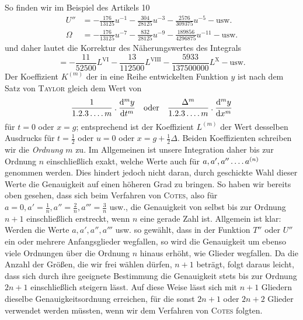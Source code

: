 So finden wir im Beispiel des Artikels 10
\[
\begin{aligned}
U''&=-\tfrac{176}{13125}u^{-1}-\tfrac{304}{28125}u^{-3}-\tfrac{2576}{309375}u^{-5}-\text{usw.}\\
\Omega&=-\tfrac{176}{13125}u^{-7}-\tfrac{832}{28125}u^{-9}-\tfrac{189856}{4296875}u^{-11}-\text{usw.}
\end{aligned}
\]
und daher lautet die Korrektur des Näherungswertes des Integrals
\[
=-\frac{11}{52500}L^{\mathrm{VI}}-\frac{13}{112500}L^{\mathrm{VIII}}-\frac{5933}{137500000}L^{\mathrm{X}}-\text{usw.}
\]
Der Koeffizient $K^{(m)}$ der in eine Reihe entwickelten Funktion $y$ ist nach dem Satz von \textsc{Taylor} gleich dem Wert von
\[
\frac{1}{1.2.3\mathinner{.\,.\,.\,.}m}\mathbin{.}\frac{\mathrm{d}^m y}{\mathrm{d}t^m}
\quad\text{oder}\quad
\frac{\Delta^m}{1.2.3\mathinner{.\,.\,.\,.}m}\mathbin{.}\frac{\mathrm{d}^m y}{\mathrm{d}x^m}
\]
für $t=0$ oder $x=g$; entsprechend ist der Koeffizient $L^{(m)}$ der Wert desselben Ausdrucks für $t=\frac12$ oder $u=0$ oder $x=g+\frac12\Delta$. Beiden Koeffizienten schreiben wir die \textit{Ordnung} $m$ zu. Im Allgemeinen ist unsere Integration daher bis zur Ordnung $n$ einschließlich exakt, welche Werte auch für $a,a',a''\mathinner{.\,.\,.\,.}a^{(n)}$ genommen werden. Dies hindert jedoch nicht daran, durch geschickte Wahl dieser Werte die Genauigkeit auf einen höheren Grad zu bringen. So haben wir bereits oben gesehen, dass sich beim Verfahren von \textsc{Cotes}, also für $a=0,a'=\frac1n,a''=\frac2n,a'''=\frac3n$ usw., die Genauigkeit von selbst bis zur Ordnung $n+1$ einschließlich erstreckt, wenn $n$ eine gerade Zahl ist. Allgemein ist klar: Werden die Werte $a,a',a'',a'''$ usw. so gewählt, dass in der Funktion $T''$ oder $U''$ ein oder mehrere Anfangsglieder wegfallen, so wird die Genauigkeit um ebenso viele Ordnungen über die Ordnung $n$ hinaus erhöht, wie Glieder wegfallen. Da die Anzahl der Größen, die wir frei wählen dürfen, $n+1$ beträgt, folgt daraus leicht, dass sich durch ihre geeignete Bestimmung die Genauigkeit stets bis zur Ordnung $2n+1$ einschließlich steigern lässt. Auf diese Weise lässt sich mit $n+1$ Gliedern dieselbe Genauigkeitsordnung erreichen, für die sonst $2n+1$ oder $2n+2$ Glieder verwendet werden müssten, wenn wir dem Verfahren von \textsc{Cotes} folgten.

